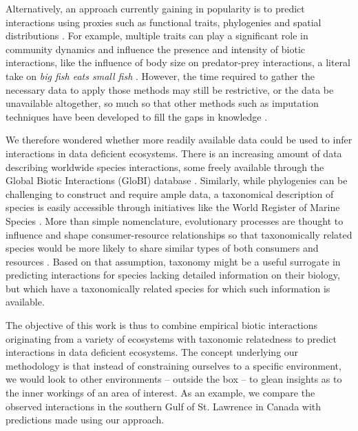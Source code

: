 Alternatively, an approach currently gaining in popularity is to predict interactions using proxies such as functional traits, phylogenies and spatial distributions \citep[e.g.][]{morales-castilla2015, bartomeus2016}. For example, multiple traits can play a significant role in community dynamics and influence the presence and intensity of biotic interactions, like the influence of body size on predator-prey interactions, a literal take on \emph{big fish eats small fish} \citep{cohen2003, brose2006a, gravel2013, seguin2014}. However, the time required to gather the necessary data to apply those methods may still be restrictive, or the data be unavailable altogether, so much so that other methods such as imputation techniques have been developed to fill the gaps in knowledge \citep[e.g.][]{penone2014, schrodt2015}.

We therefore wondered whether more readily available data could be used to infer interactions in data deficient ecosystems. There is an increasing amount of data describing worldwide species interactions, some freely available through the Global Biotic Interactions (GloBI) database \citep{poelen2014}. Similarly, while phylogenies can be challenging to construct and require ample data, a taxonomical description of species is easily accessible through initiatives like the World Register of Marine Species \citep[WoRMS; ][]{bailly2016}. More than simple nomenclature, evolutionary processes are thought to influence and shape consumer-resource relationships \citep{mouquet2012, rohr2014} so that taxonomically related species would be more likely to share similar types of both consumers and resources \citep{eklof2012, morales-castilla2015, gray2015}. Based on that assumption, taxonomy might be a useful surrogate in predicting interactions for species lacking detailed information on their biology, but which have a taxonomically related species for which such information is available.

The objective of this work is thus to combine empirical biotic interactions originating from a variety of ecosystems with taxonomic relatedness to predict interactions in data deficient ecosystems. The concept underlying our methodology is that instead of constraining ourselves to a specific environment, we would look to other environments – outside the box – to glean insights as to the inner workings of an area of interest. As an example, we compare the observed interactions in the southern Gulf of St. Lawrence in Canada \citep[SGSL; ][]{savenkoff2004} with predictions made using our approach.

